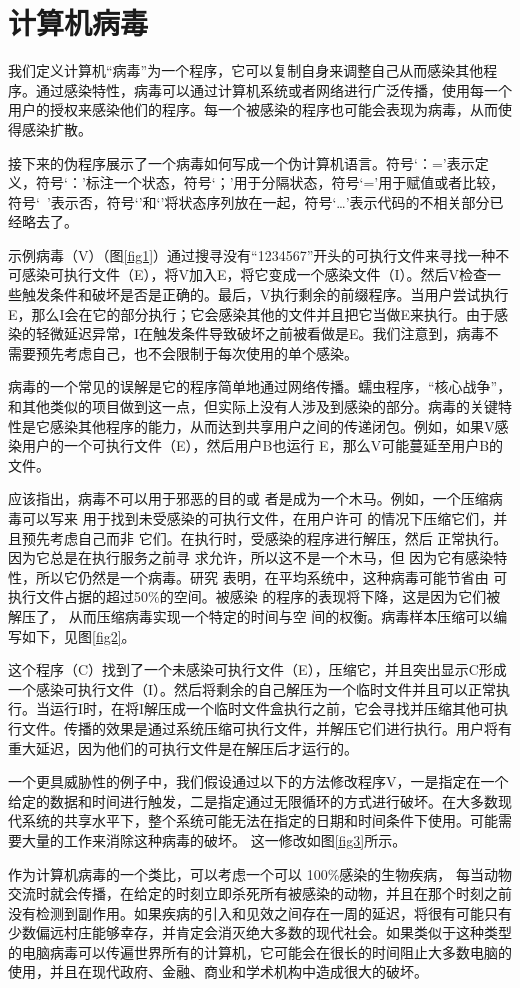 \chapter{计算机病毒}

我们定义计算机“病毒”为一个程序，它可以复制自身来调整自己从而感染其他程序。通过感染特性，病毒可以通过计算机系统或者网络进行广泛传播，使用每一个用户的授权来感染他们的程序。每一个被感染的程序也可能会表现为病毒，从而使得感染扩散。


接下来的伪程序展示了一个病毒如何写成一个伪计算机语言。符号‘：=’表示定义，符号‘：’标注一个状态，符号‘；’用于分隔状态，符号‘=’用于赋值或者比较，符号‘~’表示否，符号‘{’和‘}’将状态序列放在一起，符号‘…’表示代码的不相关部分已经略去了。


示例病毒（V）（图\ref{fig1}）通过搜寻没有“1234567”开头的可执行文件来寻找一种不可感染可执行文件（E），将V加入E，将它变成一个感染文件（I）。然后V检查一些触发条件和破坏是否是正确的。最后，V执行剩余的前缀程序。当用户尝试执行E，那么I会在它的部分执行；它会感染其他的文件并且把它当做E来执行。由于感染的轻微延迟异常，I在触发条件导致破坏之前被看做是E。我们注意到，病毒不需要预先考虑自己，也不会限制于每次使用的单个感染。



病毒的一个常见的误解是它的程序简单地通过网络传播。蠕虫程序，“核心战争”，和其他类似的项目做到这一点，但实际上没有人涉及到感染的部分。病毒的关键特性是它感染其他程序的能力，从而达到共享用户之间的传递闭包。例如，如果V感染用户的一个可执行文件（E），然后用户B也运行 E，那么V可能蔓延至用户B的文件。


应该指出，病毒不可以用于邪恶的目的或
者是成为一个木马。例如，一个压缩病毒可以写来
用于找到未受感染的可执行文件，在用户许可
的情况下压缩它们，并且预先考虑自己而非
它们。在执行时，受感染的程序进行解压，然后
正常执行。因为它总是在执行服务之前寻
求允许，所以这不是一个木马，但
因为它有感染特性，所以它仍然是一个病毒。研究
表明，在平均系统中，这种病毒可能节省由
可执行文件占据的超过50\%的空间。被感染
的程序的表现将下降，这是因为它们被解压了，
从而压缩病毒实现一个特定的时间与空
间的权衡。病毒样本压缩可以编写如下，见图\ref{fig2}。


这个程序（C）找到了一个未感染可执行文件（E），压缩它，并且突出显示C形成一个感染可执行文件（I）。然后将剩余的自己解压为一个临时文件并且可以正常执行。当运行I时，在将I解压成一个临时文件盒执行之前，它会寻找并压缩其他可执行文件。传播的效果是通过系统压缩可执行文件，并解压它们进行执行。用户将有重大延迟，因为他们的可执行文件是在解压后才运行的。


一个更具威胁性的例子中，我们假设通过以下的方法修改程序V，一是指定在一个给定的数据和时间进行触发，二是指定通过无限循环的方式进行破坏。在大多数现代系统的共享水平下，整个系统可能无法在指定的日期和时间条件下使用。可能需要大量的工作来消除这种病毒的破坏。
这一修改如图\ref{fig3}所示。


作为计算机病毒的一个类比，可以考虑一个可以
100\%感染的生物疾病，
每当动物交流时就会传播，在给定的时刻立即杀死所有被感染的动物，并且在那个时刻之前没有检测到副作用。如果疾病的引入和见效之间存在一周的延迟，将很有可能只有少数偏远村庄能够幸存，并肯定会消灭绝大多数的现代社会。如果类似于这种类型的电脑病毒可以传遍世界所有的计算机，它可能会在很长的时间阻止大多数电脑的使用，并且在现代政府、金融、商业和学术机构中造成很大的破坏。




